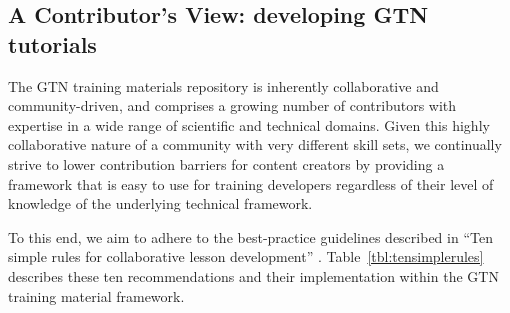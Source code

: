 \documentclass[10pt,letterpaper]{article}
\begin{document}
\subsection*{A Contributor's View: developing GTN tutorials}

The GTN training materials repository is inherently collaborative and community-driven, and comprises a growing number of contributors with expertise in a wide range of scientific and technical domains. Given this highly collaborative nature of a community with very different skill sets, we continually strive to lower contribution barriers for content creators by providing a framework that is easy to use for training developers regardless of their level of knowledge of the underlying technical framework.

To this end, we aim to adhere to the best-practice guidelines described in  “Ten simple rules for collaborative lesson development” \cite{TODO}.
Table~\ref{tbl:tensimplerules} describes these ten recommendations and their implementation within the GTN training material framework.
\end{document}
